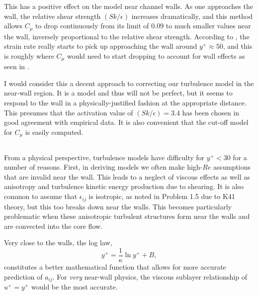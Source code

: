 \documentclass[11pt]{article}
\begin{document}
This has a positive effect on the model near channel walls. As one approaches the wall, the relative shear strength $(Sk/\epsilon)$ increases dramatically, and this method allows $C_\mu$ to drop continuously from its limit of 0.09 to much smaller values near the wall, inversely proportional to the relative shear strength. According to , the strain rate really starts to pick up approaching the wall around $y^+ \approx 50$, and this is roughly where $C_\mu$ would need to start dropping to account for wall effects as seen in .

I would consider this a decent approach to correcting our turbulence model in the near-wall region. It is a model and thus will not be perfect, but it seems to respond to the wall in a physically-justified fashion at the appropriate distance. This presumes that the activation value of $(Sk/\epsilon) = 3.4$ has been chosen in good agreement with empirical data. It is also convenient that the cut-off model for $C_\mu$ is easily computed.

\subsection{}

From a physical perspective, turbulence models have difficulty for $y^+ < 30$ for a number of reasons. First, in deriving models we often make high-$Re$ assumptions that are invalid near the wall. This leads to a neglect of viscous effects as well as anisotropy and turbulence kinetic energy production due to shearing. It is also common to assume that $\epsilon_{ij}$ is isotropic, as noted in Problem 1.5 due to K41 theory, but this too breaks down near the walls. This becomes particularly problematic when these anisotropic turbulent structures form near the walls and are convected into the core flow.

Very close to the walls, the log law,
\begin{equation}
y^+ =
\frac{1}{\kappa} \ln y^+ + B
,
\end{equation}
constitutes a better mathematical function that allows for more accurate prediction of $a_{ij}$. For \emph{very} near-wall physics, the viscous sublayer relationship of $u^+ = y^+$ would be the most accurate.

\subsection{}
\end{document}
